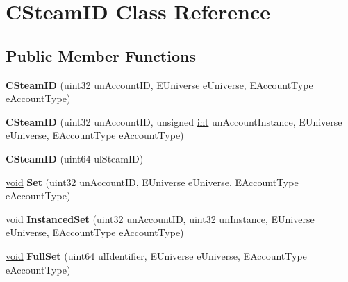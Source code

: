 \hypertarget{classCSteamID}{}\section{C\+Steam\+I\+D Class Reference}
\label{classCSteamID}
\subsection*{Public Member Functions}
\begin{DoxyCompactItemize}
\item 
\hypertarget{classCSteamID_aee9a6d20f4e904294ff5ca8f9d0f2521}{}{\bfseries C\+Steam\+I\+D} (uint32 un\+Account\+I\+D, E\+Universe e\+Universe, E\+Account\+Type e\+Account\+Type)\label{classCSteamID_aee9a6d20f4e904294ff5ca8f9d0f2521}

\item 
\hypertarget{classCSteamID_a66dea50fbae98a10058e86e5597fe396}{}{\bfseries C\+Steam\+I\+D} (uint32 un\+Account\+I\+D, unsigned \hyperlink{SDL__thread_8h_a6a64f9be4433e4de6e2f2f548cf3c08e}{int} un\+Account\+Instance, E\+Universe e\+Universe, E\+Account\+Type e\+Account\+Type)\label{classCSteamID_a66dea50fbae98a10058e86e5597fe396}

\item 
\hypertarget{classCSteamID_ab8c5add9368077f0217ea8d03e7c5743}{}{\bfseries C\+Steam\+I\+D} (uint64 ul\+Steam\+I\+D)\label{classCSteamID_ab8c5add9368077f0217ea8d03e7c5743}

\item 
\hypertarget{classCSteamID_a46fe032f5da0e7c19154527224a28a3b}{}\hyperlink{SDL__audio_8h_a52835ae37c4bb905b903cbaf5d04b05f}{void} {\bfseries Set} (uint32 un\+Account\+I\+D, E\+Universe e\+Universe, E\+Account\+Type e\+Account\+Type)\label{classCSteamID_a46fe032f5da0e7c19154527224a28a3b}

\item 
\hypertarget{classCSteamID_a1f511324c499386ae942ddcca19a78cf}{}\hyperlink{SDL__audio_8h_a52835ae37c4bb905b903cbaf5d04b05f}{void} {\bfseries Instanced\+Set} (uint32 un\+Account\+I\+D, uint32 un\+Instance, E\+Universe e\+Universe, E\+Account\+Type e\+Account\+Type)\label{classCSteamID_a1f511324c499386ae942ddcca19a78cf}

\item 
\hypertarget{classCSteamID_a6721be10705e28d39da873a0c136054b}{}\hyperlink{SDL__audio_8h_a52835ae37c4bb905b903cbaf5d04b05f}{void} {\bfseries Full\+Set} (uint64 ul\+Identifier, E\+Universe e\+Universe, E\+Account\+Type e\+Account\+Type)\label{classCSteamID_a6721be10705e28d39da873a0c136054b}


\end{DoxyCompactItemize}
